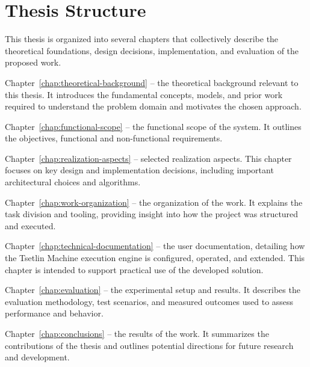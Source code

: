 \section{Thesis Structure}
This thesis is organized into several chapters that collectively describe the theoretical foundations, design decisions, implementation, and evaluation of the proposed work.

\medskip
Chapter~\ref{chap:theoretical-background} -- the theoretical background relevant to this thesis. It introduces the fundamental concepts, models, and prior work required to understand the problem domain and motivates the chosen approach.

\medskip
Chapter~\ref{chap:functional-scope} -- the functional scope of the system. It outlines the objectives, functional and non-functional requirements.

\medskip
Chapter~\ref{chap:realization-aspects} -- selected realization aspects. This chapter focuses on key design and implementation decisions, including important architectural choices and algorithms.

\medskip
Chapter~\ref{chap:work-organization} -- the organization of the work. It explains the task division and tooling, providing insight into how the project was structured and executed.

\medskip
Chapter~\ref{chap:technical-documentation} -- the user documentation, detailing how the Tsetlin Machine execution engine is configured, operated, and extended. This chapter is intended to support practical use of the developed solution.

\medskip
Chapter~\ref{chap:evaluation} -- the experimental setup and results. It describes the evaluation methodology, test scenarios, and measured outcomes used to assess performance and behavior.

\medskip
Chapter~\ref{chap:conclusions} -- the results of the work. It summarizes the contributions of the thesis and outlines potential directions for future research and development.